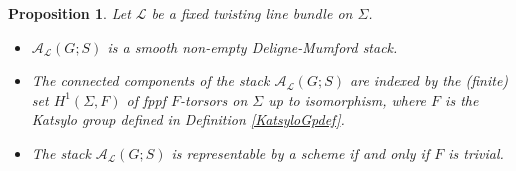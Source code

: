 \documentclass{amsart}
\newtheorem{proposition}[theorem]{Proposition}
\theoremstyle{remark}
\numberwithin{theorem}{section}
\numberwithin{equation}{section}
\begin{document}
\begin{proposition}\label{SHitchinBasePropsprp}
    Let $\mathcal L$ be a fixed twisting line bundle on $\Sigma$.
    \begin{itemize}
        \item[(i)] $\mathcal A_\mathcal L(G;S)$ is a smooth non-empty Deligne-Mumford stack.
        \item[(ii)] The connected components of the stack $\mathcal A_\mathcal L(G;S)$ are indexed by the (finite) set $H^1(\Sigma,F)$ of fppf $F$-torsors on $\Sigma$ up to isomorphism, where $F$ is the Katsylo group defined in Definition \ref{KatsyloGpdef}.
        \item[(iii)] The stack $\mathcal A_\mathcal L(G;S)$ is representable by a scheme if and only if $F$ is trivial.
    \end{itemize}
\end{proposition}
\end{document}
